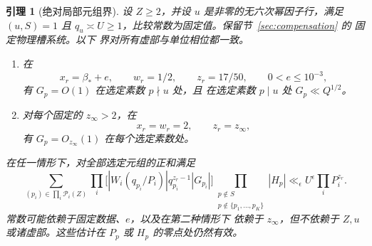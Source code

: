 \documentclass[11pt,a4paper]{article}
\numberwithin{equation}{section}
\numberwithin{figure}{section}
\newtheorem{lemma}[theorem]{引理}
\theoremstyle{definition}
\theoremstyle{remark}
\begin{document}
\begin{lemma}[绝对局部元组界]
\label{lem:compensated-absolute-local-bounds}
设 $Z\ge2$，并设 $u$ 是非零的无六次幂因子行，满足 $(u,S)=1$ 且
$q_u\asymp U\ge1$，比较常数为固定值。保留节~\ref{sec:compensation} 的
固定物理槽系统。以下
界对所有虚部与单位相位都一致。
\begin{enumerate}
\item 在
\[
 x_r=\beta_*+e,\qquad w_r=1/2,\qquad z_r=17/50,
 \qquad 0<e\le10^{-3},
\]
有 $G_p=O(1)$ 在选定素数 $p\nmid u$ 处，且
在选定素数 $p\mid u$ 处 $G_p\ll Q^{1/2}$。
\item 对每个固定的 $z_\infty>2$，在
\[
 x_r=w_r=2,\qquad z_r=z_\infty,
\]
有 $G_p=O_{z_\infty}(1)$ 在每个选定素数处。
\end{enumerate}
在任一情形下，对全部选定元组的正和满足
\begin{equation}\label{eq:absolute-local-tuple-bound}
 \sum_{(p_i)\in\prod_i\mathcal P_i(Z)}
       \prod_i\bigl[|W_i(q_{p_i}/P_i)|q_{p_i}^{z_r-1}|G_{p_i}|\bigr]
       \prod_{\substack{p\notin S\\p\notin\{p_1,\ldots,p_K\}}}|H_p|
 \ll_\epsilon U^\epsilon\prod_iP_i^{z_r}.
\end{equation}
常数可能依赖于固定数据、$e$，以及在第二种情形下
依赖于 $z_\infty$，但不依赖于 $Z,u$ 或诸虚部。这些估计在
$P_p$ 或 $H_p$ 的零点处仍然有效。
\end{lemma}
\end{document}
